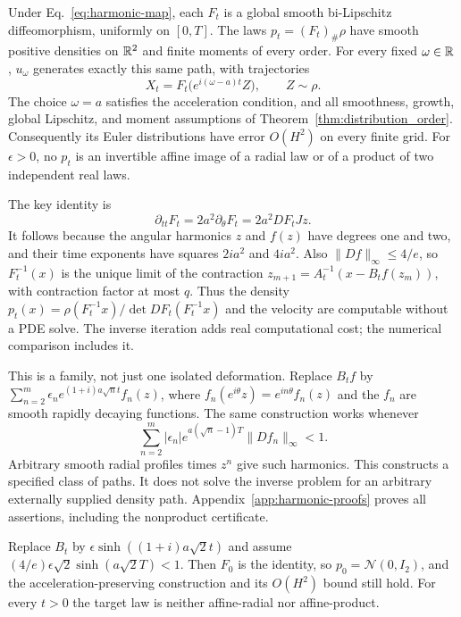 \begin{theorem}
\label{thm:harmonic-construction}
Under Eq.~\eqref{eq:harmonic-map}, each $F_t$ is a global smooth
bi-Lipschitz diffeomorphism, uniformly on $[0,T]$. The laws
$p_t=(F_t)_\#\rho$ have smooth positive densities on $\mathbb R^2$ and finite
moments of every order. For every fixed $\omega\in\mathbb R$,
$u_\omega$ generates exactly this same path, with trajectories
\[
 X_t=F_t\bigl(e^{i(\omega-a)t}Z\bigr),\qquad Z\sim\rho.
\]
The choice $\omega=a$ satisfies the acceleration condition, and all
smoothness, growth, global Lipschitz, and moment assumptions of
Theorem~\ref{thm:distribution_order}. Consequently its Euler distributions
have error $O(H^2)$ on every finite grid. For $\epsilon>0$, no $p_t$ is
an invertible affine image of a radial law or of a product of two
independent real laws.
\end{theorem}

The key identity is
\[
 \partial_{tt}F_t=2a^2\partial_\theta F_t
                 =2a^2DF_tJz.
\]
It follows because the angular harmonics $z$ and $f(z)$ have degrees one
and two, and their time exponents have squares $2ia^2$ and $4ia^2$.
Also $\|Df\|_\infty\le4/e$, so $F_t^{-1}(x)$ is the unique limit of
the contraction
$z_{m+1}=A_t^{-1}(x-B_tf(z_m))$, with contraction factor at most $q$.
Thus the density
$p_t(x)=\rho(F_t^{-1}x)/\det DF_t(F_t^{-1}x)$ and the velocity are
computable without a PDE solve. The inverse iteration adds real
computational cost; the numerical comparison includes it.

This is a family, not just one isolated deformation. Replace $B_tf$ by
$\sum_{n=2}^m\epsilon_n e^{(1+i)a\sqrt n t}f_n(z)$, where
$f_n(e^{i\theta}z)=e^{in\theta}f_n(z)$ and the $f_n$ are smooth rapidly
decaying functions. The same construction works whenever
\[
 \sum_{n=2}^m|\epsilon_n|e^{a(\sqrt n-1)T}\|Df_n\|_\infty<1.
\]
Arbitrary smooth radial profiles times $z^n$ give such harmonics.
This constructs a specified class of paths. It does not solve the
inverse problem for an arbitrary externally supplied density path.
Appendix~\ref{app:harmonic-proofs} proves all assertions, including the
nonproduct certificate.

\begin{corollary}
\label{cor:gaussian-start}
Replace $B_t$ by $\epsilon\sinh((1+i)a\sqrt2t)$ and assume
$(4/e)\epsilon\sqrt2\sinh(a\sqrt2T)<1$.
Then $F_0$ is the identity, so $p_0=\mathcal N(0,I_2)$, and the
acceleration-preserving construction and its $O(H^2)$ bound still hold.
For every $t>0$ the target law is neither affine-radial nor affine-product.
\end{corollary}

